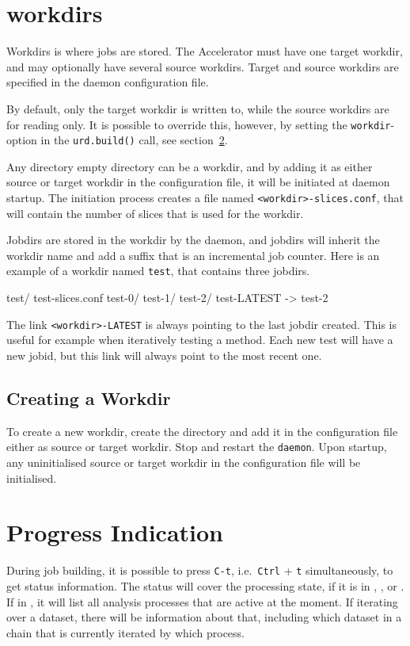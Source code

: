\clearpage
\section{workdirs}
Workdirs is where jobs are stored.  The Accelerator must have one
target workdir, and may optionally have several source workdirs.
Target and source workdirs are specified in the daemon configuration
file.

By default, only the target workdir is written to, while the source
workdirs are for reading only.  It is possible to override this,
however, by setting the \texttt{workdir}-option in
the \texttt{urd.build()} call, see section~\ref{}.

Any directory empty directory can be a workdir, and by adding it as
either source or target workdir in the configuration file, it will be
initiated at daemon startup.  The initiation process creates a file
named \texttt{<workdir>-slices.conf}, that will contain the number of
slices that is used for the workdir.

Jobdirs are stored in the workdir by the daemon, and jobdirs will
inherit the workdir name and add a suffix that is an incremental job
counter.  Here is an example of a workdir named \texttt{test}, that
contains three jobdirs.
\begin{shell}
test/
    test-slices.conf
    test-0/
    test-1/
    test-2/
    test-LATEST -> test-2
\end{shell}
The link \texttt{<workdir>-LATEST} is always pointing to the last
jobdir created.  This is useful for example when iteratively testing a
method.  Each new test will have a new jobid, but this link will
always point to the most recent one.


\subsection{Creating a Workdir}
To create a new workdir, create the directory and add it in the
configuration file either as source or target workdir.  Stop and
restart the \texttt{daemon}.  Upon startup, any uninitialised source
or target workdir in the configuration file will be initialised.






\section{Progress Indication}
During job building, it is possible to press \texttt{C-t},
i.e.\ \texttt{Ctrl} + \texttt{t} simultaneously, to get status
information.  The status will cover the processing state, if it is
in \prepare, \analysis, or \synthesis.  If in \analysis, it will list
all analysis processes that are active at the moment.  If iterating
over a dataset, there will be information about that, including which
dataset in a chain that is currently iterated by which \analysis
process.

